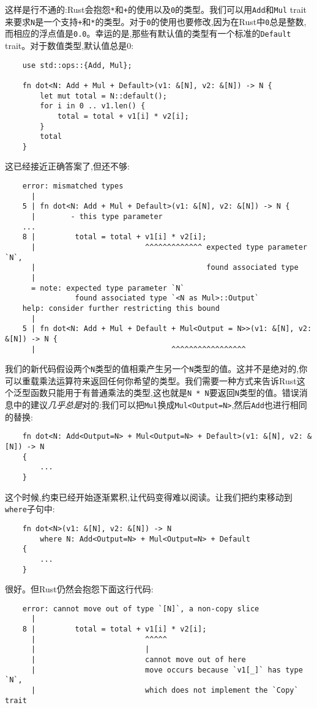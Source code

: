 这样是行不通的:Rust会抱怨\texttt{*}和\texttt{+}的使用以及\texttt{0}的类型。我们可以用\texttt{Add}和\texttt{Mul} trait来要求\texttt{N}是一个支持\texttt{+}和\texttt{*}的类型。对于\texttt{0}的使用也要修改,因为在Rust中\texttt{0}总是整数,而相应的浮点值是\texttt{0.0}。幸运的是,那些有默认值的类型有一个标准的\texttt{Default} trait。对于数值类型,默认值总是0:
\begin{verbatim}
    use std::ops::{Add, Mul};

    fn dot<N: Add + Mul + Default>(v1: &[N], v2: &[N]) -> N {
        let mut total = N::default();
        for i in 0 .. v1.len() {
            total = total + v1[i] * v2[i];
        }
        total
    }
\end{verbatim}

这已经接近正确答案了,但还不够:
\begin{verbatim}
    error: mismatched types
      |
    5 | fn dot<N: Add + Mul + Default>(v1: &[N], v2: &[N]) -> N {
      |        - this type parameter
    ...
    8 |         total = total + v1[i] * v2[i];
      |                         ^^^^^^^^^^^^^ expected type parameter `N`,
      |                                       found associated type
      |
      = note: expected type parameter `N`
                found associated type `<N as Mul>::Output`
    help: consider further restricting this bound
      |
    5 | fn dot<N: Add + Mul + Default + Mul<Output = N>>(v1: &[N], v2: &[N]) -> N {
      |                               ^^^^^^^^^^^^^^^^^
\end{verbatim}

我们的新代码假设两个\texttt{N}类型的值相乘产生另一个\texttt{N}类型的值。这并不是绝对的,你可以重载乘法运算符来返回任何你希望的类型。我们需要一种方式来告诉Rust这个泛型函数只能用于有普通乘法的类型,这也就是\texttt{N * N}要返回\texttt{N}类型的值。错误消息中的建议\emph{几乎总是}对的:我们可以把\texttt{Mul}换成\texttt{Mul<Output=N>},然后\texttt{Add}也进行相同的替换:
\begin{verbatim}
    fn dot<N: Add<Output=N> + Mul<Output=N> + Default>(v1: &[N], v2: &[N]) -> N
    {
        ...
    }
\end{verbatim}

这个时候,约束已经开始逐渐累积,让代码变得难以阅读。让我们把约束移动到\texttt{where}子句中:
\begin{verbatim}
    fn dot<N>(v1: &[N], v2: &[N]) -> N
        where N: Add<Output=N> + Mul<Output=N> + Default
    {
        ...
    }
\end{verbatim}

很好。但Rust仍然会抱怨下面这行代码:
\begin{verbatim}
    error: cannot move out of type `[N]`, a non-copy slice
      |
    8 |         total = total + v1[i] * v2[i];
      |                         ^^^^^
      |                         |
      |                         cannot move out of here
      |                         move occurs because `v1[_]` has type `N`,
      |                         which does not implement the `Copy` trait
\end{verbatim}

